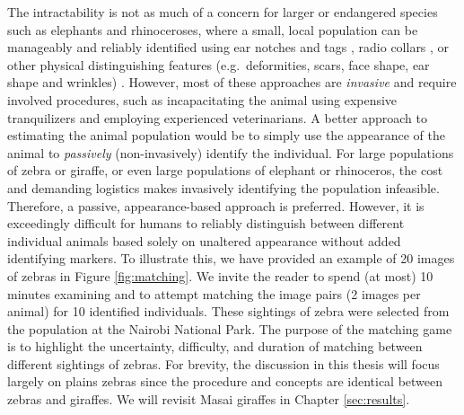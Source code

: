 The intractability is not as much of a concern for larger or endangered species such as elephants and rhinoceroses, where a small, local population can be manageably and reliably identified using ear notches and tags \cite{mukinya_identification_1976}, radio collars \cite{alexander_african_1994, mech_critique_2002, thouless_long_1995}, or other physical distinguishing features (e.g.\ deformities, scars, face shape, ear shape and wrinkles) \cite{patrick_demographic_2003, sikes_guidelines_2011}.   However, most of these approaches are \textit{invasive} and require involved procedures, such as incapacitating the animal using expensive tranquilizers and employing experienced veterinarians.  A better approach to estimating the animal population would be to simply use the appearance of the animal to \textit{passively} (non-invasively) identify the individual.  For large populations of zebra or giraffe, or even large populations of elephant or rhinoceros, the cost and demanding logistics makes invasively identifying the population infeasible.  Therefore, a passive, appearance-based approach is preferred.  However, it is exceedingly difficult for humans to reliably distinguish between different individual animals based solely on unaltered appearance \cite{crall_hotspotter_2013} without added identifying markers.  To illustrate this, we have provided an example of 20 images of zebras in Figure \ref{fig:matching}.  We invite the reader to spend (at most) 10 minutes examining and to attempt matching the image pairs (2 images per animal) for 10 identified individuals.  These sightings of zebra were selected from the population at the Nairobi National Park.  The purpose of the matching game is to highlight the uncertainty, difficulty, and duration of matching between different sightings of zebras.  For brevity, the discussion in this thesis will focus largely on plains zebras since the procedure and concepts are identical between zebras and giraffes.  We will revisit Masai giraffes in Chapter \ref{sec:results}.

